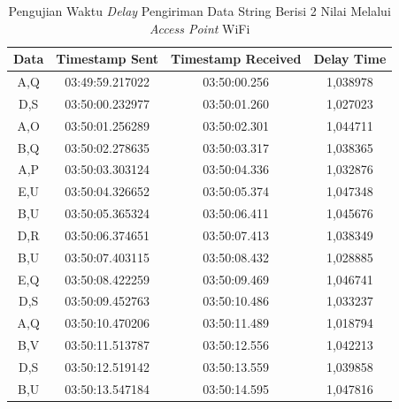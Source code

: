 \begin{longtable}{|ccc|c|}
  \caption{Pengujian Waktu \emph{Delay} Pengiriman Data String Berisi 2 Nilai Melalui \emph{Access Point} WiFi}
  \label{tbl:delayWiFi2}\\
  \hline
  \multicolumn{1}{|c|}{Data} & \multicolumn{1}{c|}{Timestamp Sent}  & Timestamp Received & Delay Time  \\ \hline
  \endfirsthead
  \endhead
  \multicolumn{1}{|c|}{A,Q}  & \multicolumn{1}{c|}{03:49:59.217022} & 03:50:00.256       & 1,038978    \\ \hline
  \multicolumn{1}{|c|}{D,S}  & \multicolumn{1}{c|}{03:50:00.232977} & 03:50:01.260       & 1,027023    \\ \hline
  \multicolumn{1}{|c|}{A,O}  & \multicolumn{1}{c|}{03:50:01.256289} & 03:50:02.301       & 1,044711    \\ \hline
  \multicolumn{1}{|c|}{B,Q}  & \multicolumn{1}{c|}{03:50:02.278635} & 03:50:03.317       & 1,038365    \\ \hline
  \multicolumn{1}{|c|}{A,P}  & \multicolumn{1}{c|}{03:50:03.303124} & 03:50:04.336       & 1,032876    \\ \hline
  \multicolumn{1}{|c|}{E,U}  & \multicolumn{1}{c|}{03:50:04.326652} & 03:50:05.374       & 1,047348    \\ \hline
  \multicolumn{1}{|c|}{B,U}  & \multicolumn{1}{c|}{03:50:05.365324} & 03:50:06.411       & 1,045676    \\ \hline
  \multicolumn{1}{|c|}{D,R}  & \multicolumn{1}{c|}{03:50:06.374651} & 03:50:07.413       & 1,038349    \\ \hline
  \multicolumn{1}{|c|}{B,U}  & \multicolumn{1}{c|}{03:50:07.403115} & 03:50:08.432       & 1,028885    \\ \hline
  \multicolumn{1}{|c|}{E,Q}  & \multicolumn{1}{c|}{03:50:08.422259} & 03:50:09.469       & 1,046741    \\ \hline
  \multicolumn{1}{|c|}{D,S}  & \multicolumn{1}{c|}{03:50:09.452763} & 03:50:10.486       & 1,033237    \\ \hline
  \multicolumn{1}{|c|}{A,Q}  & \multicolumn{1}{c|}{03:50:10.470206} & 03:50:11.489       & 1,018794    \\ \hline
  \multicolumn{1}{|c|}{B,V}  & \multicolumn{1}{c|}{03:50:11.513787} & 03:50:12.556       & 1,042213    \\ \hline
  \multicolumn{1}{|c|}{D,S}  & \multicolumn{1}{c|}{03:50:12.519142} & 03:50:13.559       & 1,039858    \\ \hline
  \multicolumn{1}{|c|}{B,U}  & \multicolumn{1}{c|}{03:50:13.547184} & 03:50:14.595       & 1,047816    \\ \hline

\end{longtable}

